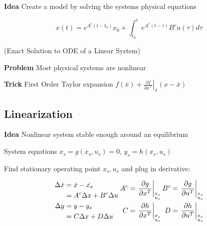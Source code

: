 


\textbf{Idea}
Create a model by solving the systems physical equations

\[
	x(t) = e^{A^c(t-t_0)}x_0 +
	\textstyle\int_{t_0}^{t}e^{A^c(t-\tau)}B^c u(\tau)d\tau
\]
\centerline{\scriptsize
	(Exact Solution to ODE of a Linear System)}

\textbf{Problem}
Most physical systems are nonlinear

\textbf{Trick}
First Order Taylor expansion
$f(\bar{x}) + \left. \frac{\partial f}{\partial x^\top} \right
	\rvert_{\bar{x}} (x-\bar{x})$

\subsection{Linearization}
\textbf{Idea}
Nonlinear system  stable enough around an equilibrium

System equations
$\dot{x_s} = g(x_s,u_s)=0$, $y_s = h(x_s,u_s)$

Find stationary operating point $x_s,u_s$ and plug in derivative:

\begin{align*}
	\begin{aligned}
		\Delta \dot{x} & =\dot{x} -\dot{x_s}         \\
		               & = A^c\Delta x + B^c\Delta u \\
		\Delta y       & = y - y_s                   \\
		               & = C\Delta x + D\Delta u
	\end{aligned}
	\hspace{1mm}
	\begin{aligned}
		A^c             & =  \left.\frac{\partial g}{\partial x^T}\right| _{\substack{x_s                                                                    \\u_s}}
		\hspace{-1.4mm} & \hspace{-1.4mm}B^c                                              & =   \left.\frac{\partial g}{\partial u^T}\right| _{\substack{x_s \\u_s}}
		\\
		C               & =  \left.\frac{\partial h}{\partial x^T}\right| _{\substack{x_s                                                                    \\u_s}}
		\hspace{-1.4mm} & \hspace{-1.4mm}D                                                & =   \left.\frac{\partial h}{\partial u^T}\right| _{\substack{x_s \\u_s}}
	\end{aligned}
\end{align*}

